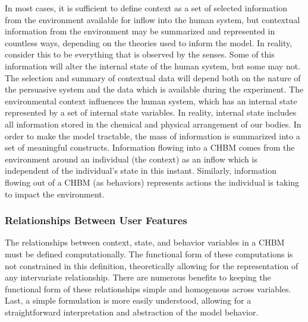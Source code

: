 \documentclass[runningheads,a4paper]{llncs}
\begin{document}
In most cases, it is sufficient to define context as a set of selected information from the environment available for inflow into the human system, but contextual information from the environment may be summarized and represented in countless ways, depending on the theories used to inform the model.
In reality, consider this to be everything that is observed by the senses. 
Some of this information will alter the internal state of the human system, but some may not. 
The selection and summary of contextual data will depend both on the nature of the persuasive system and the data which is available during the experiment.
The environmental context influences the human system, which has an internal state represented by a set of internal state variables.
In reality, internal state includes all information stored in the chemical and physical  arrangement of our bodies. 
In order to make the model tractable, the mass of information is summarized into a set of meaningful constructs.
Information flowing into a CHBM comes from the environment around an individual (the context) as an inflow which is independent of the individual's state in this instant.
Similarly, information flowing out of a CHBM (as behaviors) represents actions the individual is taking to impact the environment.

\subsubsection{Relationships Between User Features}
The relationships between context, state, and behavior variables in a CHBM must be defined computationally.
The functional form of these computations is not constrained in this definition, theoretically allowing for the representation of any intervariate relationship.
There are numerous benefits to keeping the functional form of these relationships simple and homogenous across variables.
Last, a simple formulation is more easily understood, allowing for a straightforward interpretation and abstraction of the model behavior.
\end{document}
